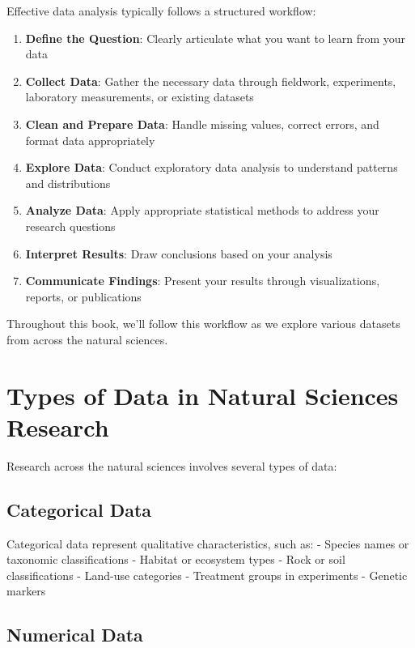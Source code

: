 \documentclass[
  letterpaper,
]{book}
\providecommand{\tightlist}{%
  \setlength{\itemsep}{0pt}\setlength{\parskip}{0pt}}
\begin{document}
Effective data analysis typically follows a structured workflow:

\begin{enumerate}
\def\labelenumi{\arabic{enumi}.}
\tightlist
\item
  \textbf{Define the Question}: Clearly articulate what you want to
  learn from your data
\item
  \textbf{Collect Data}: Gather the necessary data through fieldwork,
  experiments, laboratory measurements, or existing datasets
\item
  \textbf{Clean and Prepare Data}: Handle missing values, correct
  errors, and format data appropriately
\item
  \textbf{Explore Data}: Conduct exploratory data analysis to understand
  patterns and distributions
\item
  \textbf{Analyze Data}: Apply appropriate statistical methods to
  address your research questions
\item
  \textbf{Interpret Results}: Draw conclusions based on your analysis
\item
  \textbf{Communicate Findings}: Present your results through
  visualizations, reports, or publications
\end{enumerate}

Throughout this book, we'll follow this workflow as we explore various
datasets from across the natural sciences.

\section{Types of Data in Natural Sciences
Research}\label{types-of-data-in-natural-sciences-research}

Research across the natural sciences involves several types of data:

\subsection{Categorical Data}\label{categorical-data}

Categorical data represent qualitative characteristics, such as: -
Species names or taxonomic classifications - Habitat or ecosystem types
- Rock or soil classifications - Land-use categories - Treatment groups
in experiments - Genetic markers

\subsection{Numerical Data}\label{numerical-data}
\end{document}
